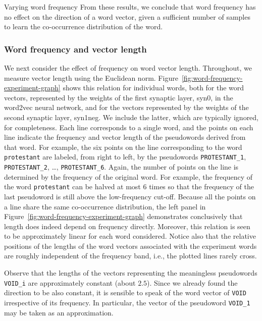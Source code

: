 \documentclass{article} %
\newcommand{\word}[1]{\texttt{#1}}
\begin{document}
\begin{section}{Varying word frequency}
From these results, we conclude that word frequency has no effect on the
direction of a word vector, given a sufficient number of samples to
learn the co-occurrence distribution of the word.

\subsubsection{Word frequency and vector length}
We next consider the effect of frequency on word vector length.
Throughout, we measure vector length using the Euclidean norm.
Figure~\ref{fig:word-frequency-experiment-graph} shows this relation for
individual words, both for the word vectors, represented by the weights
of the first synaptic layer, syn0, in the word2vec neural network, and
for the vectors represented by the weights of the second synaptic layer,
syn1neg.  We include the latter, which are typically ignored, for
completeness.  Each line corresponds to a single word, and the points on
each line indicate the frequency and vector length of the pseudowords derived
from that word.  For example, the six points on the line corresponding
to the word \word{protestant} are labeled, from right to left, by the
pseudowords \word{PROTESTANT\_1}, \word{PROTESTANT\_2}, \dots,
\word{PROTESTANT\_6}.  Again, the number of points on the line is
determined by the frequency of the original word.  For example, the
frequency of the word \word{protestant} can be halved at most $6$ times
so that the frequency of the last pseudoword is still above the low-frequency
cut-off.  Because all the points on a line share the same co-occurrence
distribution, the left panel in
Figure~\ref{fig:word-frequency-experiment-graph} demonstrates
conclusively that length does indeed depend on frequency directly.
Moreover, this relation is seen to be approximately linear for each word
considered.  Notice also that the relative positions of the lengths of
the word vectors associated with the experiment words are roughly
independent of the frequency band, i.e., the plotted lines rarely cross.

Observe that the lengths of the vectors representing the meaningless pseudowords
\word{VOID\_i} are approximately constant (about $2.5$).  Since we
already found the direction to be also constant, it is sensible to speak
of the word vector of \word{VOID} irrespective of its frequency.  In
particular, the vector of the pseudoword \word{VOID\_1} may be taken as an approximation.


\end{section}
\end{document}
